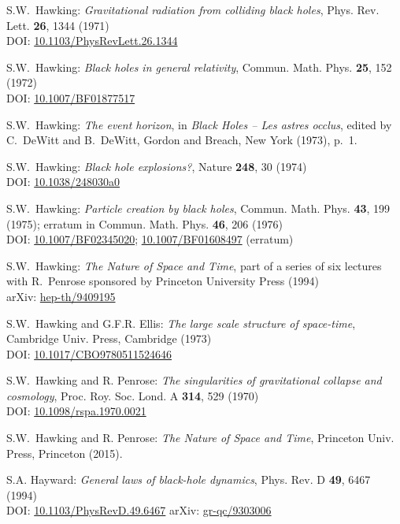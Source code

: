 \begin{thebibliography}{123}
S.W.~Hawking: {\em Gravitational radiation from colliding black holes},
Phys. Rev. Lett. {\bf 26}, 1344 (1971)\\
DOI: \href{https://doi.org/10.1103/PhysRevLett.26.1344}{10.1103/PhysRevLett.26.1344}

S.W.~Hawking: {\em Black holes in general relativity},
Commun. Math. Phys. {\bf 25}, 152 (1972)\\
DOI: \href{https://doi.org/10.1007/BF01877517}{10.1007/BF01877517}

S.W.~Hawking: {\em The event horizon},
in {\em Black Holes -- Les astres occlus}, edited by C.~DeWitt and B.~DeWitt,
Gordon and Breach, New York (1973), p.~1.

S.W.~Hawking: {\em Black hole explosions?},
Nature {\bf 248}, 30 (1974)\\
DOI: \href{https://doi.org/10.1038/248030a0}{10.1038/248030a0}

S.W.~Hawking: {\em Particle creation by black holes},
Commun. Math. Phys. {\bf 43}, 199 (1975); erratum
in Commun. Math. Phys. {\bf 46}, 206 (1976) \\
DOI: \href{https://doi.org/10.1007/BF02345020}{10.1007/BF02345020};
\href{https://doi.org/10.1007/BF01608497}{10.1007/BF01608497} (erratum)

S.W.~Hawking: {\em The Nature of Space and Time}, part of a series of six lectures with
R.~Penrose sponsored by Princeton University Press (1994)\\
arXiv: \href{https://arxiv.org/abs/hep-th/9409195}{hep-th/9409195}

S.W.~Hawking and G.F.R. Ellis: {\em The large scale structure of
space-time},
Cambridge Univ. Press, Cambridge (1973)\\
DOI: \href{https://doi.org/10.1017/CBO9780511524646}{10.1017/CBO9780511524646}

S.W.~Hawking and R. Penrose: {\em The singularities of gravitational collapse and cosmology},
Proc. Roy. Soc. Lond. A {\bf 314}, 529 (1970)\\
DOI: \href{https://doi.org/10.1098/rspa.1970.0021}{10.1098/rspa.1970.0021}

S.W.~Hawking and R. Penrose: {\em The Nature of Space and Time},
Princeton Univ. Press, Princeton (2015).

S.A. Hayward:
{\em General laws of black-hole dynamics},
Phys. Rev. D {\bf 49}, 6467 (1994)\\
DOI: \href{https://doi.org/10.1103/PhysRevD.49.6467}{10.1103/PhysRevD.49.6467}\hfill
arXiv: \href{https://arxiv.org/abs/gr-qc/9303006}{gr-qc/9303006}


\end{thebibliography}
